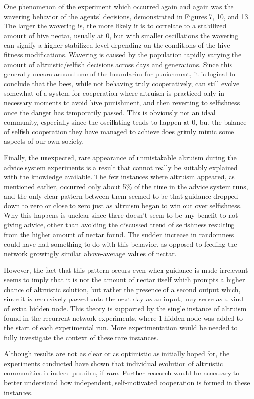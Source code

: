 \documentclass[twoside]{article}
\begin{document}
\begin{multicols}{2}
        One phenomenon of the experiment which occurred again and again was the wavering behavior of the agents' decisions, demonstrated in Figures 7, 10, and 13. The larger the wavering is, the more likely it is to correlate to a stabilized amount of hive nectar, usually at 0, but with smaller oscillations the wavering can signify a higher stabilized level depending on the conditions of the hive fitness modifications. Wavering is caused by the population rapidly varying the amount of altruistic/selfish decisions across days and generations. Since this generally occurs around one of the boundaries for punishment, it is logical to conclude that the bees, while not behaving truly cooperatively, can still evolve somewhat of a system for cooperation where altruism is practiced only in necessary moments to avoid hive punishment, and then reverting to selfishness once the danger has temporarily passed. This is obviously not an ideal community, especially since the oscillating tends to happen at 0, but the balance of selfish cooperation they have managed to achieve does grimly mimic some aspects of our own society.

        Finally, the unexpected, rare appearance of unmistakable altruism during the advice system experiments is a result that cannot really be suitably explained with the knowledge available. The few instances where altruism appeared, as mentioned earlier, occurred only about 5\% of the time in the advice system runs, and the only clear pattern between them seemed to be that guidance dropped down to zero or close to zero just as altruism began to win out over selfishness. Why this happens is unclear since there doesn't seem to be any benefit to not giving advice, other than avoiding the discussed trend of selfishness resulting from the higher amount of nectar found. The sudden increase in randomness could have had something to do with this behavior, as opposed to feeding the network growingly similar above-average values of nectar.
        
        However, the fact that this pattern occurs even when guidance is made irrelevant seems to imply that it is not the amount of nectar itself which prompts a higher chance of altruistic solution, but rather the presence of a second output which, since it is recursively passed onto the next day as an input, may serve as a kind of extra hidden node. This theory is supported by the single instance of altruism found in the recurrent network experiments, where 1 hidden node was added to the start of each experimental run. More experimentation would be needed to fully investigate the context of these rare instances.

        Although results are not as clear or as optimistic as initially hoped for, the experiments conducted have shown that individual evolution of altruistic communities is indeed possible, if rare. Further research would be necessary to better understand how independent, self-motivated cooperation is formed in these instances.


	\nocite{*}
	
	
\end{multicols}
\end{document}
